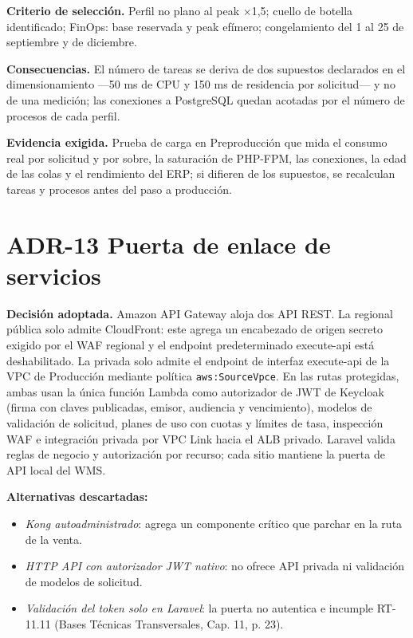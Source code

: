 \textbf{Criterio de selección.} Perfil no plano al peak $\times$1,5; cuello de botella identificado; FinOps: base reservada y peak efímero; congelamiento del 1 al 25 de septiembre y de diciembre.

\textbf{Consecuencias.} El número de tareas se deriva de dos supuestos declarados en el dimensionamiento ---50 ms de CPU y 150 ms de residencia por solicitud--- y no de una medición; las conexiones a PostgreSQL quedan acotadas por el número de procesos de cada perfil.

\textbf{Evidencia exigida.} Prueba de carga en Preproducción que mida el consumo real por solicitud y por sobre, la saturación de PHP-FPM, las conexiones, la edad de las colas y el rendimiento del ERP; si difieren de los supuestos, se recalculan tareas y procesos antes del paso a producción.

\section{ADR-13 \textperiodcentered{} Puerta de enlace de servicios}
\label{sub:adr-13}

\textbf{Decisión adoptada.} Amazon API Gateway aloja dos API REST. La regional pública solo admite CloudFront: este agrega un encabezado de origen secreto exigido por el WAF regional y el endpoint predeterminado execute-api está deshabilitado. La privada solo admite el endpoint de interfaz execute-api de la VPC de Producción mediante política \texttt{aws:SourceVpce}. En las rutas protegidas, ambas usan la única función Lambda como autorizador de JWT de Keycloak (firma con claves publicadas, emisor, audiencia y vencimiento), modelos de validación de solicitud, planes de uso con cuotas y límites de tasa, inspección WAF e integración privada por VPC Link hacia el ALB privado. Laravel valida reglas de negocio y autorización por recurso; cada sitio mantiene la puerta de API local del WMS.

\textbf{Alternativas descartadas:}

\begin{itemize}
  \item \emph{Kong autoadministrado}: agrega un componente crítico que parchar en la ruta de la venta.
  \item \emph{HTTP API con autorizador JWT nativo}: no ofrece API privada ni validación de modelos de solicitud.
  \item \emph{Validación del token solo en Laravel}: la puerta no autentica e incumple RT-11.11 (Bases Técnicas Transversales, Cap. 11, p. 23).
\end{itemize}

